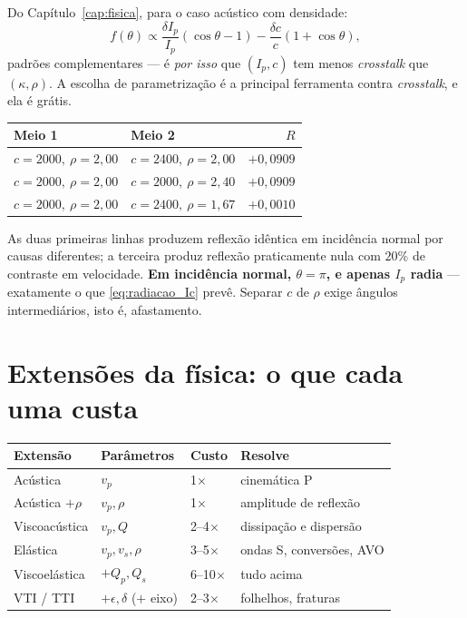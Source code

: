 \documentclass[11pt,a4paper,oneside]{report}
\begin{document}
Do Cap\'itulo~\ref{cap:fisica}, para o caso ac\'ustico com densidade:
\[
f(\theta) \propto
 \frac{\delta I_p}{I_p}(\cos\theta - 1)
 - \frac{\delta c}{c}(1+\cos\theta),
\]
padr\~oes complementares --- \'e \emph{por isso} que $(I_p,c)$ tem menos
\emph{crosstalk} que $(\kappa,\rho)$. A escolha de parametriza\c{c}\~ao \'e a
principal ferramenta contra \emph{crosstalk}, e ela \'e gr\'atis.

\begin{atencao}
\begin{center}
\begin{tabular}{@{}llr@{}}
\toprule
\textbf{Meio 1} & \textbf{Meio 2} & $R$ \\
\midrule
$c=2000,\ \rho=2{,}00$ & $c=2400,\ \rho=2{,}00$ & $+0{,}0909$ \\
$c=2000,\ \rho=2{,}00$ & $c=2000,\ \rho=2{,}40$ & $+0{,}0909$ \\
$c=2000,\ \rho=2{,}00$ & $c=2400,\ \rho=1{,}67$ & $+0{,}0010$ \\
\bottomrule
\end{tabular}
\end{center}
As duas primeiras linhas produzem reflex\~ao id\^entica em incid\^encia normal
por causas diferentes; a terceira produz reflex\~ao praticamente nula com
$20\%$ de contraste em velocidade. \textbf{Em incid\^encia normal, $\theta =
\pi$, e apenas $I_p$ radia} --- exatamente o que \eqref{eq:radiacao_Ic}
prev\^e. Separar $c$ de $\rho$ exige \^angulos intermedi\'arios, isto \'e,
afastamento.
\end{atencao}

\section{Extens\~oes da f\'isica: o que cada uma custa}

\begin{center}
\begin{tabular}{@{}llll@{}}
\toprule
\textbf{Extens\~ao} & \textbf{Par\^ametros} & \textbf{Custo} & \textbf{Resolve} \\
\midrule
Ac\'ustica & $v_p$ & 1$\times$ & cinem\'atica P \\
Ac\'ustica $+\rho$ & $v_p,\rho$ & 1$\times$ & amplitude de reflex\~ao \\
Viscoac\'ustica & $v_p,Q$ & 2--4$\times$ & dissipa\c{c}\~ao e dispers\~ao \\
El\'astica & $v_p,v_s,\rho$ & 3--5$\times$ & ondas S, convers\~oes, AVO \\
Viscoel\'astica & $+Q_p,Q_s$ & 6--10$\times$ & tudo acima \\
VTI / TTI & $+\epsilon,\delta$ ($+$ eixo) & 2--3$\times$ & folhelhos, fraturas \\
\bottomrule
\end{tabular}
\end{center}
\end{document}
